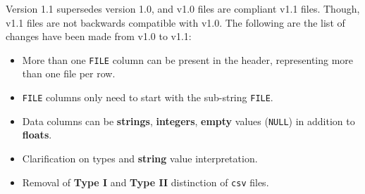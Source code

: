 Version 1.1 supersedes version 1.0, and v1.0 files are compliant v1.1 files.
Though, v1.1 files are not backwards compatible with v1.0.  
The following are the list of changes have been made from v1.0 to v1.1:

\begin{itemize}
\item More than one \texttt{\small FILE} column can be present in the header, 
  representing more than one file per row.
\item \texttt{\small FILE} columns only need to start with the sub-string 
  \texttt{\small FILE}.
\item Data columns can be {\bf strings}, {\bf integers}, {\bf empty} values 
  (\texttt{\small NULL}) in addition to {\bf floats}. 
\item Clarification on types and {\bf string} value interpretation.
\item Removal of {\bf Type I} and {\bf Type II} distinction of 
  \texttt{\small csv} files.
\end{itemize}
